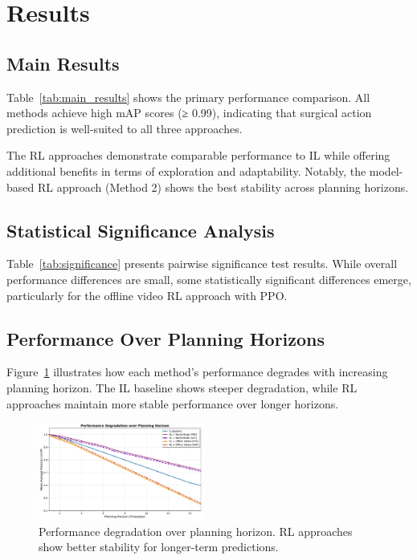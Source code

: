 \documentclass[conference]{IEEEtran}
\begin{document}
\section{Results}

\subsection{Main Results}

Table~\ref{tab:main_results} shows the primary performance comparison. All methods achieve high mAP scores (≥ 0.99), indicating that surgical action prediction is well-suited to all three approaches.



The RL approaches demonstrate comparable performance to IL while offering additional benefits in terms of exploration and adaptability. Notably, the model-based RL approach (Method 2) shows the best stability across planning horizons.

\subsection{Statistical Significance Analysis}

Table~\ref{tab:significance} presents pairwise significance test results. While overall performance differences are small, some statistically significant differences emerge, particularly for the offline video RL approach with PPO.



\subsection{Performance Over Planning Horizons}

Figure~\ref{fig:horizon_performance} illustrates how each method's performance degrades with increasing planning horizon. The IL baseline shows steeper degradation, while RL approaches maintain more stable performance over longer horizons.

\begin{figure}[htbp]
\centering
\includegraphics[width=0.48\textwidth]{figures/horizon_performance.pdf}
\caption{Performance degradation over planning horizon. RL approaches show better stability for longer-term predictions.}
\label{fig:horizon_performance}
\end{figure}
\end{document}

